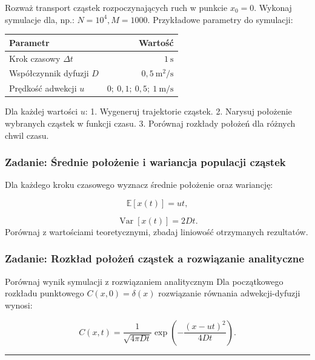 \documentclass[
  polish,
  letterpaper,
  DIV=11,
  numbers=noendperiod]{scrartcl}
\newcounter{none} %
\begin{document}
Rozważ transport cząstek rozpoczynających ruch w punkcie \(x_0=0\).
Wykonaj symulacje dla, np.: \(N=10^4,M=1000.\) Przykładowe parametry do
symulacji:

{\def\LTcaptype{none} %
\begin{longtable}[]{@{}lr@{}}
\toprule\noalign{}
Parametr & Wartość \\
\midrule\noalign{}
\endhead
\bottomrule\noalign{}
\endlastfoot
Krok czasowy \(\Delta t\) & \(1\ \mathrm{s}\) \\
Współczynnik dyfuzji \(D\) & \(0{,}5\ \mathrm{m^2/s}\) \\
Prędkość adwekcji \(u\) & \(0;\ 0{,}1;\ 0{,}5;\ 1\ \mathrm{m/s}\) \\
\end{longtable}
}

Dla każdej wartości \(u\): 1. Wygeneruj trajektorie cząstek. 2. Narysuj
położenie wybranych cząstek w funkcji czasu. 3. Porównaj rozkłady
położeń dla różnych chwil czasu.

\subsubsection{Zadanie: Średnie położenie i wariancja populacji
cząstek}\label{zadanie-ux15brednie-poux142oux17cenie-i-wariancja-populacji-czux105stek-1}

Dla każdego kroku czasowego wyznacz średnie położenie oraz wariancję:

\[
\mathbb{E}[x(t)]=ut,
\]

\[
\operatorname{Var}[x(t)]=2Dt.
\] Porównaj z wartościami teoretycznymi, zbadaj liniowość otrzymanych
rezultatów.

\subsubsection{Zadanie: Rozkład położeń cząstek a rozwiązanie
analityczne}\label{zadanie-rozkux142ad-poux142oux17ceux144-czux105stek-a-rozwiux105zanie-analityczne}

Porównaj wynik symulacji z rozwiązaniem analitycznym Dla początkowego
rozkładu punktowego \(C(x,0)=\delta(x)\) rozwiązanie równania
adwekcji-dyfuzji wynosi:

\[
C(x,t)= \frac{1}{\sqrt{4\pi Dt}}  \exp\left(-\frac{(x-ut)^2}{4Dt}\right).
\]

\begin{center}\rule{0.5\linewidth}{0.5pt}\end{center}
\end{document}
